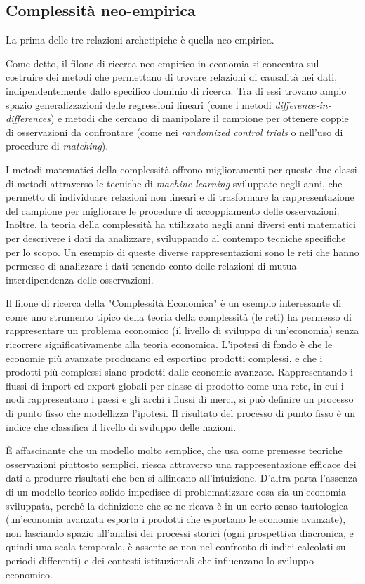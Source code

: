 \documentclass[a4paper, headings=standardclasses]{scrartcl}
\begin{document}
\subsection{Complessità neo-empirica}
La prima delle tre relazioni archetipiche è quella neo-empirica.

Come detto, il filone di ricerca neo-empirico in economia si concentra sul costruire dei metodi che permettano di trovare relazioni di causalità nei dati, indipendentemente dallo specifico dominio di ricerca. Tra di essi trovano ampio spazio generalizzazioni delle regressioni lineari (come i metodi \textit{difference-in-differences}) e metodi che cercano di manipolare il campione per ottenere coppie di osservazioni da confrontare (come nei \textit{randomized control trials} o nell'uso di procedure di \textit{matching}).

I metodi matematici della complessità offrono miglioramenti per queste due classi di metodi attraverso le tecniche di \textit{machine learning} sviluppate negli anni, che permetto di individuare relazioni non lineari e di trasformare la rappresentazione del campione per migliorare le procedure di accoppiamento delle osservazioni.
Inoltre, la teoria della complessità ha utilizzato negli anni diversi enti matematici per descrivere i dati da analizzare, sviluppando al contempo tecniche specifiche per lo scopo.
Un esempio di queste diverse rappresentazioni sono le reti che hanno permesso di analizzare i dati tenendo conto delle relazioni di mutua interdipendenza delle osservazioni. 

Il filone di ricerca della "Complessità Economica" \parencite{hidalgo2021} è un esempio interessante di come uno strumento tipico della teoria della complessità (le reti) ha permesso di rappresentare un problema economico (il livello di sviluppo di un'economia) senza ricorrere significativamente alla teoria economica.
L'ipotesi di fondo è che le economie più avanzate producano ed esportino prodotti complessi, e che i prodotti più complessi siano prodotti dalle economie avanzate.
Rappresentando i flussi di import ed export globali per classe di prodotto come una rete, in cui i nodi rappresentano i paesi e gli archi i flussi di merci, si può definire un processo di punto fisso che modellizza l'ipotesi.
Il risultato del processo di punto fisso è un indice che classifica il livello di sviluppo delle nazioni.

È affascinante che un modello molto semplice, che usa come premesse teoriche osservazioni piuttosto semplici, riesca attraverso una rappresentazione efficace dei dati a produrre risultati che ben si allineano all'intuizione.
D'altra parta l'assenza di un modello teorico solido impedisce di problematizzare cosa sia un'economia sviluppata, perché la definizione che se ne ricava è in un certo senso tautologica (un'economia avanzata esporta i prodotti che esportano le economie avanzate), non lasciando spazio all'analisi dei processi storici (ogni prospettiva diacronica, e quindi una scala temporale, è assente se non nel confronto di indici calcolati su periodi differenti) e dei contesti istituzionali che influenzano lo sviluppo economico.
\end{document}
